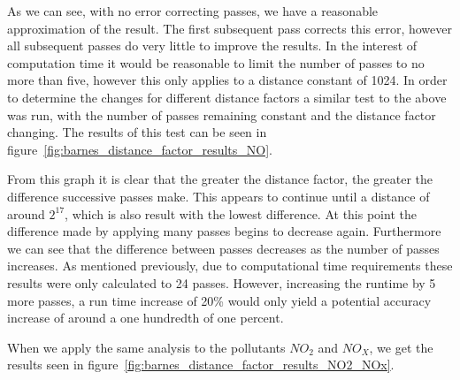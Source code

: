         	

        	As we can see, with no error correcting passes, we have a reasonable approximation of the result. The first subsequent pass corrects this error, however all subsequent passes do very little to improve the results. In the interest of computation time it would be reasonable to limit the number of passes to no more than five, however this only applies to a distance constant of 1024. In order to determine the changes for different distance factors a similar test to the above was run, with the number of passes remaining constant and the distance factor changing. The results of this test can be seen in figure~\ref{fig:barnes_distance_factor_results_NO}.


        	From this graph it is clear that the greater the distance factor, the greater the difference successive passes make. This appears to continue until a distance of around $2^{17}$, which is also result with the lowest difference. At this point the difference made by applying many passes begins to decrease again. Furthermore we can see that the difference between passes decreases as the number of passes increases. As mentioned previously, due to computational time requirements these results were only calculated to 24 passes. However, increasing the runtime by 5 more passes, a run time increase of 20\% would only yield a potential accuracy increase of around a one hundredth of one percent. 

        	When we apply the same analysis to the pollutants $NO_{2}$ and $NO_{X}$, we get the results seen in figure~\ref{fig:barnes_distance_factor_results_NO2_NOx}. 

